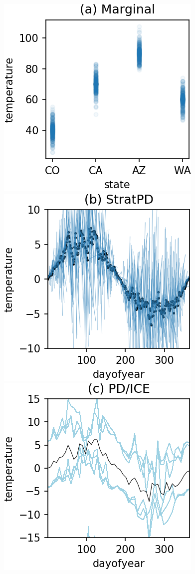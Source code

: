 \documentclass[12pt]{article}
\begin{document}
\begin{figure}[htbp]
\begin{center}
\includegraphics[scale=0.7]{images/state_vs_temp.png}
\includegraphics[scale=0.7]{images/dayofyear_vs_temp_stratpd.png}
\includegraphics[scale=0.7]{images/dayofyear_vs_temp_pdp.png}

\end{center}
\end{figure}
\end{document}
